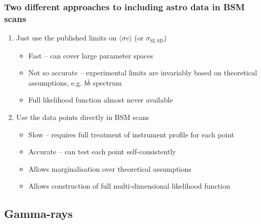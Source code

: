 \documentclass[xcolor=dvipsnames]{beamer}
\begin{document}
\begin{frame}

  \frametitle{Two different approaches to including astro data in BSM scans}

  \begin{enumerate}

  \item{Just use the published limits on $\langle \sigma v\rangle$ (or $\sigma_\mathrm{SI,SD}$)}

    \begin{itemize}

    \item{Fast -- can cover large parameter spaces}

    \item{Not so accurate -- experimental limits are invariably based on theoretical assumptions, e.g. $b\bar b$ spectrum}

    \item{Full likelihood function almost never available}

    \end{itemize}

  \item\alert<2-3>{Use the data points directly in BSM scans} 

    \begin{itemize}

    \item{Slow -- requires full treatment of instrument profile for each point}

    \item{Accurate -- can test each point self-consistently}

    \item{Allows marginalisation over theoretical assumptions}

    \item{Allows construction of full multi-dimensional likelihood function}

    \end{itemize}


  \end{enumerate}

\end{frame}


\subsection{Gamma-rays}
\end{document}
